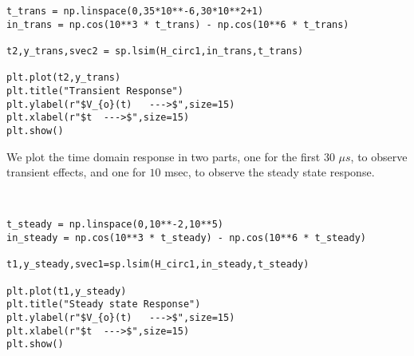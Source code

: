 \documentclass[11pt]{article}
\begin{document}
		
	
\begin{verbatim}
t_trans = np.linspace(0,35*10**-6,30*10**2+1)
in_trans = np.cos(10**3 * t_trans) - np.cos(10**6 * t_trans)

t2,y_trans,svec2 = sp.lsim(H_circ1,in_trans,t_trans)

plt.plot(t2,y_trans)
plt.title("Transient Response")
plt.ylabel(r"$V_{o}(t)   --->$",size=15)
plt.xlabel(r"$t  --->$",size=15)
plt.show()
\end{verbatim}
			
		
	
		
			
		
	
		
			
		
	
		
			
		
	
		
			
		
	

	

	

	
		
    We plot the time domain response in two parts, one for the first 30
\(\mu s\), to observe transient effects, and one for \(10\) msec, to
observe the steady state response.

	

	

    \begin{center}
    \end{center}
    { \hspace*{\fill} \\}
    
    \begin{verbatim}
t_steady = np.linspace(0,10**-2,10**5)
in_steady = np.cos(10**3 * t_steady) - np.cos(10**6 * t_steady)

t1,y_steady,svec1=sp.lsim(H_circ1,in_steady,t_steady)

plt.plot(t1,y_steady)
plt.title("Steady state Response")
plt.ylabel(r"$V_{o}(t)   --->$",size=15)
plt.xlabel(r"$t  --->$",size=15)
plt.show()
    \end{verbatim}
    
	

    \begin{center}
    \end{center}
    { \hspace*{\fill} \\}
    
\end{document}
